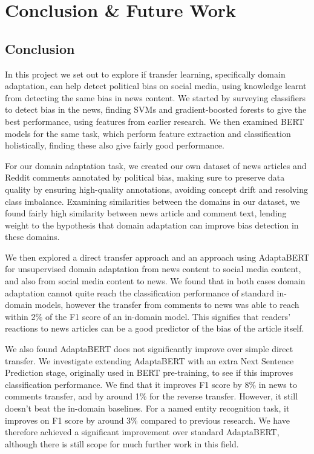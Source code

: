 \chapter{Conclusion \& Future Work}

\section{Conclusion}

In this project we set out to explore if transfer learning, specifically domain adaptation, can help detect political bias on social media, using knowledge learnt from detecting the same bias in news content. We started by surveying classifiers to detect bias in the news, finding SVMs and gradient-boosted forests to give the best performance, using features from earlier research. We then examined BERT models for the same task, which perform feature extraction and classification holistically, finding these also give fairly good performance.

For our domain adaptation task, we created our own dataset of news articles and Reddit comments annotated by political bias, making sure to preserve data quality by ensuring high-quality annotations, avoiding concept drift and resolving class imbalance. Examining similarities between the domains in our dataset, we found fairly high similarity between news article and comment text, lending weight to the hypothesis that domain adaptation can improve bias detection in these domains.

We then explored a direct transfer approach and an approach using AdaptaBERT for unsupervised domain adaptation from news content to social media content, and also from social media content to news. We found that in both cases domain adaptation cannot quite reach the classification performance of standard in-domain models, however the transfer from comments to news was able to reach within 2\% of the F1 score of an in-domain model. This signifies that readers' reactions to news articles can be a good predictor of the bias of the article itself.

We also found AdaptaBERT does not significantly improve over simple direct transfer. We investigate extending AdaptaBERT with an extra Next Sentence Prediction stage, originally used in BERT pre-training, to see if this improves classification performance. We find that it improves F1 score by 8\% in news to comments transfer, and by around 1\% for the reverse transfer. However, it still doesn't beat the in-domain baselines. For a named entity recognition task, it improves on F1 score by around 3\% compared to previous research. We have therefore achieved a significant improvement over standard AdaptaBERT, although there is still scope for much further work in this field.

